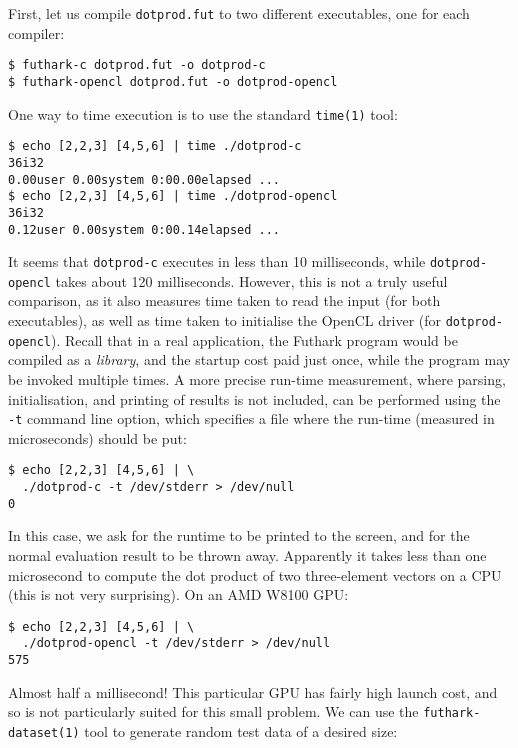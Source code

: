 \documentclass[oneside,11pt]{book}
\begin{document}
First, let us compile \texttt{dotprod.fut} to two different
executables, one for each compiler:

\begin{verbatim}
$ futhark-c dotprod.fut -o dotprod-c
$ futhark-opencl dotprod.fut -o dotprod-opencl
\end{verbatim}

One way to time execution is to use the standard \texttt{time(1)}
tool:

\begin{verbatim}
$ echo [2,2,3] [4,5,6] | time ./dotprod-c
36i32
0.00user 0.00system 0:00.00elapsed ...
$ echo [2,2,3] [4,5,6] | time ./dotprod-opencl
36i32
0.12user 0.00system 0:00.14elapsed ...
\end{verbatim}

It seems that \texttt{dotprod-c} executes in less than 10
milliseconds, while \texttt{dotprod-opencl} takes about 120
milliseconds.  However, this is not a truly useful comparison, as it
also measures time taken to read the input (for both executables), as
well as time taken to initialise the OpenCL driver (for
\texttt{dotprod-opencl}).  Recall that in a real application, the
Futhark program would be compiled as a \textit{library}, and the
startup cost paid just once, while the program may be invoked multiple
times.  A more precise run-time measurement, where parsing,
initialisation, and printing of results is not included, can be
performed using the \texttt{-t} command line option, which specifies a
file where the run-time (measured in microseconds) should be put:

\begin{verbatim}
$ echo [2,2,3] [4,5,6] | \
  ./dotprod-c -t /dev/stderr > /dev/null
0
\end{verbatim}

In this case, we ask for the runtime to be printed to the screen, and
for the normal evaluation result to be thrown away.  Apparently it
takes less than one microsecond to compute the dot product of two
three-element vectors on a CPU (this is not very surprising).  On an
AMD W8100 GPU:

\begin{verbatim}
$ echo [2,2,3] [4,5,6] | \
  ./dotprod-opencl -t /dev/stderr > /dev/null
575
\end{verbatim}

Almost half a millisecond!  This particular GPU has fairly high launch
cost, and so is not particularly suited for this small problem.  We
can use the \texttt{futhark-dataset(1)} tool to generate random test
data of a desired size:
\end{document}
